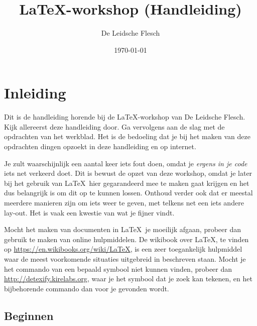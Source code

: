 \documentclass{article}
\title{\LaTeX-workshop (Handleiding)}
\author{De Leidsche Flesch}
\date{\today}
\begin{document}
\maketitle
\tableofcontents
\newpage

\section{Inleiding}

Dit is de handleiding horende bij de \LaTeX-workshop van De Leidsche Flesch.
Kijk allereerst deze handleiding door. Ga vervolgens aan de slag met de opdrachten van het werkblad. Het is
de bedoeling dat je bij het maken van deze opdrachten dingen opzoekt in deze handleiding en op internet. 

Je zult waarschijnlijk een aantal keer iets fout doen, omdat je \emph{ergens in
je code} iets net verkeerd doet. Dit is bewust de opzet van deze workshop, omdat
je later bij het gebruik van \LaTeX\ hier gegarandeerd mee te maken gaat krijgen
en het dus belangrijk is om dit op te kunnen lossen. Onthoud verder ook dat er
meestal meerdere manieren zijn om iets weer te geven, met telkens net een iets
andere lay-out. Het is vaak een kwestie van wat je fijner vindt.

Mocht het maken van documenten in \LaTeX  \ je moeilijk afgaan, probeer dan gebruik te maken van online hulpmiddelen. De wikibook over \LaTeX, te vinden op \url{https://en.wikibooks.org/wiki/LaTeX}, is een zeer toegankelijk hulpmiddel waar de meest voorkomende situaties uitgebreid in beschreven staan. Mocht je het commando van een bepaald symbool niet kunnen vinden, probeer dan \url{http://detexify.kirelabs.org}, waar je het symbool dat je zoek kan tekenen, en het bijbehorende commando dan voor je gevonden wordt.

\subsection{Beginnen}
\end{document}
